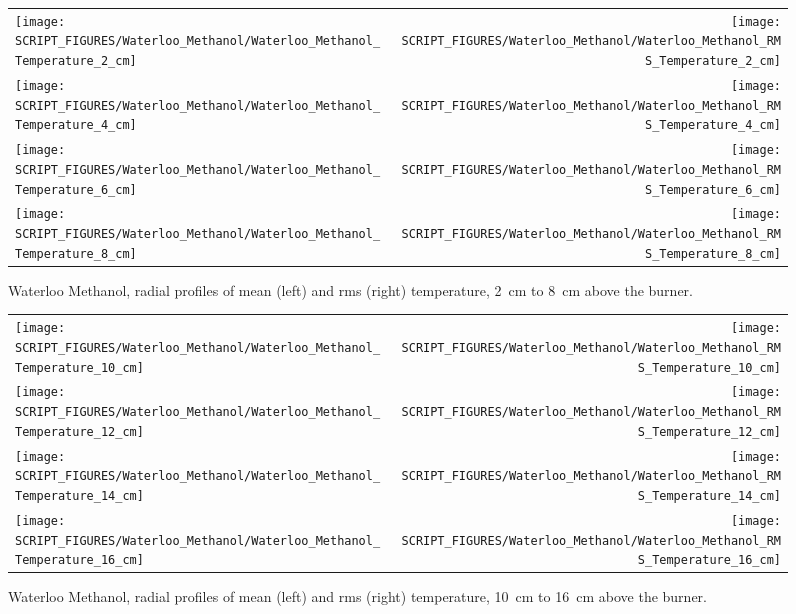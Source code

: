 \begin{figure}[p]
\begin{tabular*}{\textwidth}{l@{\extracolsep{\fill}}r}
\texttt{[image: SCRIPT\_FIGURES/Waterloo\_Methanol/Waterloo\_Methanol\_Temperature\_2\_cm]} &
\texttt{[image: SCRIPT\_FIGURES/Waterloo\_Methanol/Waterloo\_Methanol\_RMS\_Temperature\_2\_cm]} \\
\texttt{[image: SCRIPT\_FIGURES/Waterloo\_Methanol/Waterloo\_Methanol\_Temperature\_4\_cm]} &
\texttt{[image: SCRIPT\_FIGURES/Waterloo\_Methanol/Waterloo\_Methanol\_RMS\_Temperature\_4\_cm]} \\
\texttt{[image: SCRIPT\_FIGURES/Waterloo\_Methanol/Waterloo\_Methanol\_Temperature\_6\_cm]} &
\texttt{[image: SCRIPT\_FIGURES/Waterloo\_Methanol/Waterloo\_Methanol\_RMS\_Temperature\_6\_cm]} \\
\texttt{[image: SCRIPT\_FIGURES/Waterloo\_Methanol/Waterloo\_Methanol\_Temperature\_8\_cm]} &
\texttt{[image: SCRIPT\_FIGURES/Waterloo\_Methanol/Waterloo\_Methanol\_RMS\_Temperature\_8\_cm]}
\end{tabular*}
\caption[Waterloo Methanol, radial mean and rms temperature, 2~cm to 8~cm above burner]
{Waterloo Methanol, radial profiles of mean (left) and rms (right) temperature, 2~cm to 8~cm above the burner.}
\label{Water_Methanol_Plume_Temp_1}
\end{figure}

\begin{figure}[p]
\begin{tabular*}{\textwidth}{l@{\extracolsep{\fill}}r}
\texttt{[image: SCRIPT\_FIGURES/Waterloo\_Methanol/Waterloo\_Methanol\_Temperature\_10\_cm]} &
\texttt{[image: SCRIPT\_FIGURES/Waterloo\_Methanol/Waterloo\_Methanol\_RMS\_Temperature\_10\_cm]} \\
\texttt{[image: SCRIPT\_FIGURES/Waterloo\_Methanol/Waterloo\_Methanol\_Temperature\_12\_cm]} &
\texttt{[image: SCRIPT\_FIGURES/Waterloo\_Methanol/Waterloo\_Methanol\_RMS\_Temperature\_12\_cm]} \\
\texttt{[image: SCRIPT\_FIGURES/Waterloo\_Methanol/Waterloo\_Methanol\_Temperature\_14\_cm]} &
\texttt{[image: SCRIPT\_FIGURES/Waterloo\_Methanol/Waterloo\_Methanol\_RMS\_Temperature\_14\_cm]} \\
\texttt{[image: SCRIPT\_FIGURES/Waterloo\_Methanol/Waterloo\_Methanol\_Temperature\_16\_cm]} &
\texttt{[image: SCRIPT\_FIGURES/Waterloo\_Methanol/Waterloo\_Methanol\_RMS\_Temperature\_16\_cm]}
\end{tabular*}
\caption[Waterloo Methanol, radial mean and rms temperature, 10~cm to 16~cm above burner]
{Waterloo Methanol, radial profiles of mean (left) and rms (right) temperature, 10~cm to 16~cm above the burner.}
\label{Water_Methanol_Plume_Temp_2}
\end{figure}

